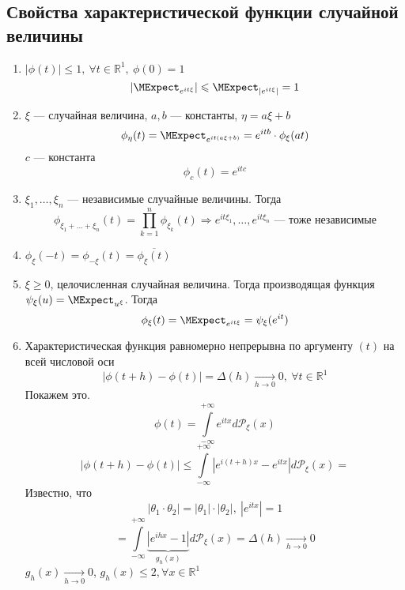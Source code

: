 \subsection{Свойства характеристической функции случайной величины}
\begin{enumerate}[wide, labelwidth=!, labelindent=0pt]
	\item $|\phi(t)| \leqslant 1, \ \forall t \in \mathbb{R}^1, \ \phi(0) = 1$ \\
\[ | \MExpect_{e^{it \xi}} | \leqslant \MExpect_{|e^{it \xi}|} = 1 \]
	\item $\xi$ --- случайная величина, $a, b$ --- константы, $\eta = a \xi + b$
\[
	\phi_{\eta} (t) = \MExpect_{e^{it(a \xi + b)}} = e^{it b} \cdot \phi_{\xi} (at)
\]
$c$ --- константа
\[
	\phi_c (t) = e^{itc}
\]
	\item $\xi_1, \ldots, \xi_n$ --- независимые случайные величины. Тогда
\[
	\phi_{\xi_1 + \ldots + \xi_n} (t) = \prod\limits_{k = 1}^{n} \phi_{\xi_k} (t) \Rightarrow e^{it \xi_1}, \ldots, e^{it \xi_n} \text{ --- тоже независимые}
\]
\item $\phi_{\xi} (-t) = \phi_{- \xi} (t) = \overline{\phi_{\xi} (t)}$
\item $\xi \geqslant 0$, целочисленная случайная величина. Тогда производящая функция $\psi_{\xi} (u) = \MExpect_{u^{\xi}}$. Тогда
\[
	\phi_{\xi} (t) = \MExpect_{e^{it\xi}} = \psi_{\xi} (e^{it})
\]
\item Характеристическая функция равномерно непрерывна по аргументу $(t)$ на всей числовой оси
\[
	| \phi(t + h) - \phi(t) | = \Delta (h) \underset{h \to 0}{\rightarrow} 0, \ \forall t \in \mathbb{R}^1
\]
Покажем это.
\[
	\phi(t) = \int\limits_{-\infty}^{+\infty} e^{itx} d \mathcal{P}_{\xi} (x)
\]
\[
	| \phi (t + h) - \phi (t) | \leqslant \int\limits_{-\infty}^{+\infty} | e^{i (t + h) x} - e^{itx} | d \mathcal{P}_{\xi} (x) =
\]
Известно, что
\[
	| \theta_1 \cdot \theta_2 | = |\theta_1| \cdot | \theta_2 |, \ | e^{itx} | = 1
\]
\[
	= \int\limits_{-\infty}^{+\infty} \underbrace{| e^{ihx} - 1 |}_{g_h (x)} d \mathcal{P}_{\xi} (x) = \Delta (h) \underset{h \to 0}{\rightarrow} 0
\]
$g_h(x) \underset{h \to 0}{\rightarrow} 0$, $g_h(x) \leqslant 2, \forall x \in \mathbb{R}^1$

\end{enumerate}
